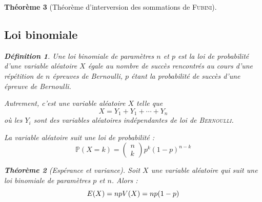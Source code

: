 \documentclass[11pt,a4paper]{report}
\newtheorem{theorem}{Théorème}[chapter]
\theoremstyle{definition}
\newtheorem{dfn}[theorem]{Définition}
\begin{document}
\begin{theorem}[Théorème d'interversion des sommations de \textsc{Fubini}]
{{\subsection{Loi binomiale} %
\label{sub:loi_binomiale}
\begin{dfn}
     Une \emph{loi binomiale} de paramètres $n$ et $p$ est la loi de probabilité d'une variable aléatoire $X$ égale au nombre de succès rencontrés au cours d'une répétition de $n$ épreuves de Bernoulli, $p$ étant la probabilité de succès d'une épreuve de Bernoulli.\par
     Autrement, c'est une variable aléatoire $X$ telle que 
     \[
         X = Y_1 + Y_1 + \cdots + Y_n
     \]
     où les $Y_i$ sont des variables aléatoires \emph{indépendantes} de loi de \textsc{Bernoulli}.\par
     La variable aléatoire suit une loi de probabilité : 
     \begin{equation}
     \mathbb{P}(X = k) = \begin{pmatrix} n \\ k \end{pmatrix} p^k(1-p)^{n-k}
     \end{equation}
\end{dfn}
\begin{theorem}[Espérance et variance]
     Soit $X$ une variable aléatoire qui suit une loi binomiale de paramètres $p$ et $n$. Alors :
     \begin{equation}
     E(X) = np \\ V(X) = np(1-p)
     \end{equation}
\end{theorem}

}}
\end{theorem}
\end{document}
